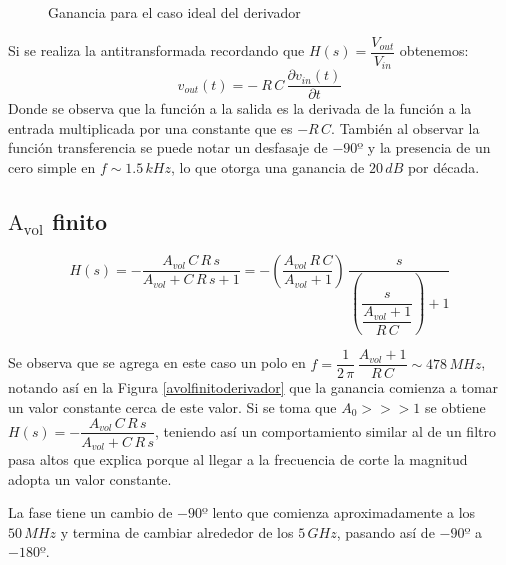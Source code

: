 \documentclass[11pt, a4paper]{article}
\begin{document}
\begin{center}
	\begin{figure}[H]	
	\caption{Ganancia para el caso ideal del derivador}
	\label{fig:avolidealderivador}
	\end{figure}
\end{center}

Si se realiza la antitransformada recordando que $H(s)= \dfrac{V_{out}}{V_{in}}$ obtenemos:
\begin{equation} 
v_{out} (t) = - \ R \,C \, \dfrac{\partial v_{in}(t)}{\partial t}
\end{equation}
Donde se observa que la función a la salida es la derivada de la función a la entrada multiplicada por una constante que es $- R\,C$. También al observar la función transferencia se puede notar un desfasaje de $-90º$ y la presencia de un cero simple en $f \sim 1.5 \,kHz$, lo que otorga una ganancia de $20 \, dB$ por década.

\subsection{$\mathrm{A_{vol}}$ finito}
\begin{equation}
H(s) = - \dfrac{A_{vol} \,C\,R\,s}{A_{vol} + C \,R \,s +1 } 
= -
\left( \dfrac{A_{vol} \,R \,C}{A_{vol} + 1} \right) \, \dfrac{s}{ \left( \dfrac{s}{\dfrac {A_{vol} +1}{R \,C}} \right) + 1}
\end{equation}

Se observa que se agrega en este caso un polo en $f = \dfrac{1}{2 \,\pi} \, \dfrac {A_{vol} +1}{R \,C} \sim 478 \, MHz $, notando así en la Figura \ref{avolfinitoderivador} que la ganancia comienza a tomar un valor constante  cerca de este valor. Si se toma que $A_0 >>> 1$ se obtiene $H(s)=- \dfrac{A_{vol} \,C\,R\,s}{A_{vol} + C \,R \,s}$, teniendo así un comportamiento similar al de un filtro pasa altos que explica porque al llegar a la frecuencia de corte la magnitud adopta un valor constante.

La fase tiene un cambio de $-90º$ lento que comienza aproximadamente a los $50 \, MHz$ y termina de cambiar alrededor de los $5 \,GHz$, pasando así de $-90º$ a $-180º$.
\end{document}
